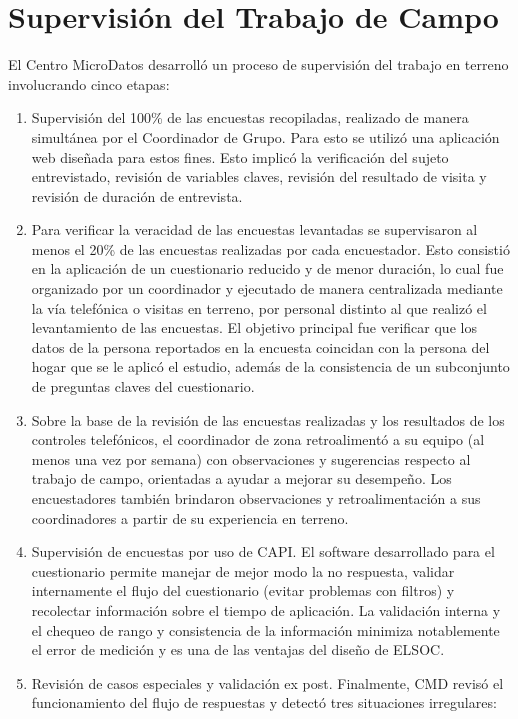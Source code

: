 \documentclass[
]{book}
\begin{document}
\hypertarget{supervisiuxf3n-del-trabajo-de-campo}{%
\section{Supervisión del Trabajo de Campo}\label{supervisiuxf3n-del-trabajo-de-campo}}

El Centro MicroDatos desarrolló un proceso de supervisión del trabajo en terreno involucrando cinco etapas:

\begin{enumerate}
\def\labelenumi{\arabic{enumi}.}
\item
  Supervisión del 100\% de las encuestas recopiladas, realizado de manera simultánea por el Coordinador de Grupo. Para esto se utilizó una aplicación web diseñada para estos fines. Esto implicó la verificación del sujeto entrevistado, revisión de variables claves, revisión del resultado de visita y revisión de duración de entrevista.
\item
  Para verificar la veracidad de las encuestas levantadas se supervisaron al menos el 20\% de las encuestas realizadas por cada encuestador. Esto consistió en la aplicación de un cuestionario reducido y de menor duración, lo cual fue organizado por un coordinador y ejecutado de manera centralizada mediante la vía telefónica o visitas en terreno, por personal distinto al que realizó el levantamiento de las encuestas. El objetivo principal fue verificar que los datos de la persona reportados en la encuesta coincidan con la persona del hogar que se le aplicó el estudio, además de la consistencia de un subconjunto de preguntas claves del cuestionario.
\item
  Sobre la base de la revisión de las encuestas realizadas y los resultados de los controles telefónicos, el coordinador de zona retroalimentó a su equipo (al menos una vez por semana) con observaciones y sugerencias respecto al trabajo de campo, orientadas a ayudar a mejorar su desempeño. Los encuestadores también brindaron observaciones y retroalimentación a sus coordinadores a partir de su experiencia en terreno.
\item
  Supervisión de encuestas por uso de CAPI. El software desarrollado para el cuestionario permite manejar de mejor modo la no respuesta, validar internamente el flujo del cuestionario (evitar problemas con filtros) y recolectar información sobre el tiempo de aplicación. La validación interna y el chequeo de rango y consistencia de la información minimiza notablemente el error de medición y es una de las ventajas del diseño de ELSOC.
\item
  Revisión de casos especiales y validación ex post. Finalmente, CMD revisó el funcionamiento del flujo de respuestas y detectó tres situaciones irregulares:


\end{enumerate}
\end{document}

